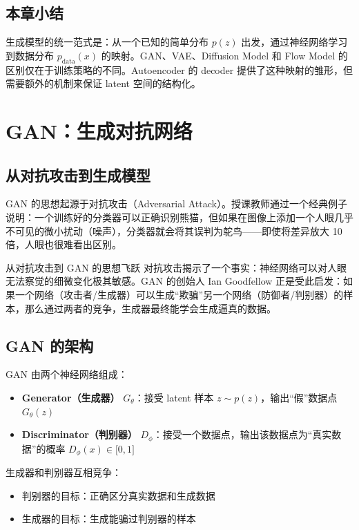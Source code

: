 \documentclass[a4paper]{article}
\begin{document}
\subsection{本章小结}

生成模型的统一范式是：从一个已知的简单分布 $p(z)$ 出发，通过神经网络学习到数据分布 $p_{\text{data}}(x)$ 的映射。GAN、VAE、Diffusion Model 和 Flow Model 的区别仅在于训练策略的不同。Autoencoder 的 decoder 提供了这种映射的雏形，但需要额外的机制来保证 latent 空间的结构化。

\newpage
\section{GAN：生成对抗网络}

\subsection{从对抗攻击到生成模型}

GAN 的思想起源于对抗攻击（Adversarial Attack）。授课教师通过一个经典例子说明：一个训练好的分类器可以正确识别熊猫，但如果在图像上添加一个人眼几乎不可见的微小扰动（噪声），分类器就会将其误判为鸵鸟——即使将差异放大 10 倍，人眼也很难看出区别。

\begin{knowledgebox}{从对抗攻击到 GAN 的思想飞跃}
对抗攻击揭示了一个事实：神经网络可以对人眼无法察觉的细微变化极其敏感。GAN 的创始人 Ian Goodfellow 正是受此启发：如果一个网络（攻击者/生成器）可以生成``欺骗''另一个网络（防御者/判别器）的样本，那么通过两者的竞争，生成器最终能学会生成逼真的数据。
\end{knowledgebox}

\subsection{GAN 的架构}

GAN 由两个神经网络组成：

\begin{itemize}
    \item \textbf{Generator（生成器）} $G_\theta$：接受 latent 样本 $z \sim p(z)$，输出``假''数据点 $G_\theta(z)$
    \item \textbf{Discriminator（判别器）} $D_\phi$：接受一个数据点，输出该数据点为``真实数据''的概率 $D_\phi(x) \in {[}0, 1{]}$
\end{itemize}

生成器和判别器互相竞争：
\begin{itemize}
    \item 判别器的目标：正确区分真实数据和生成数据
    \item 生成器的目标：生成能骗过判别器的样本
\end{itemize}
\end{document}
